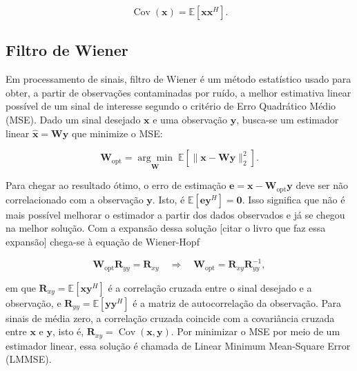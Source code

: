 \begin{equation}
\operatorname{Cov}(\mathbf{x})=\mathbb{E}[\mathbf{x}\mathbf{x}^H].
\label{eq:cov_definition}
\end{equation}


\subsection{Filtro de Wiener}

Em processamento de sinais, filtro de Wiener é um método estatístico usado para obter, a partir de observações contaminadas por ruído, a melhor estimativa linear possível de um sinal de interesse segundo o critério de Erro Quadrático Médio (MSE). Dado um sinal desejado $\mathbf{x}$ e uma observação $\mathbf{y}$, busca-se um estimador linear $\hat{\mathbf{x}}=\mathbf{W}\mathbf{y}$ que minimize o MSE:

\begin{equation}
\mathbf{W}_{\text{opt}} = \underset{\mathbf{W}}{\arg\min}\;
\mathbb{E}\left[\|\mathbf{x}-\mathbf{W}\mathbf{y}\|_2^2\right].
\label{eq:wiener_opt}
\end{equation}

Para chegar ao resultado ótimo, o erro de estimação $\mathbf{e}=\mathbf{x}-\mathbf{W}_{\text{opt}}\mathbf{y}$ deve ser não correlacionado com a observação $\mathbf{y}$. Isto, é $\mathbb{E}[\mathbf{e}\mathbf{y}^H]=\mathbf{0}$. Isso significa que não é mais possível melhorar o estimador a partir dos dados observados e já se chegou na melhor solução. Com a expansão dessa solução [citar o livro que faz essa expansão] chega-se à equação de Wiener-Hopf


\begin{equation}
\mathbf{W}_{\text{opt}}\mathbf{R}_{yy} = \mathbf{R}_{xy}
\quad\Rightarrow\quad
\mathbf{W}_{\text{opt}} = \mathbf{R}_{xy}\mathbf{R}_{yy}^{-1},
\label{eq:wiener_hopf}
\end{equation}

em que $\mathbf{R}_{xy}=\mathbb{E}[\mathbf{x}\mathbf{y}^H]$ é a correlação
cruzada entre o sinal desejado e a observação, e
$\mathbf{R}_{yy}=\mathbb{E}[\mathbf{y}\mathbf{y}^H]$ é a matriz de
autocorrelação da observação. Para sinais de média zero, a correlação
cruzada coincide com a covariância cruzada entre $\mathbf{x}$ e $\mathbf{y}$,
isto é, $\mathbf{R}_{xy}=\operatorname{Cov}(\mathbf{x},\mathbf{y})$. Por
minimizar o MSE por meio de um estimador linear, essa solução é chamada de
Linear Minimum Mean-Square Error (LMMSE).

